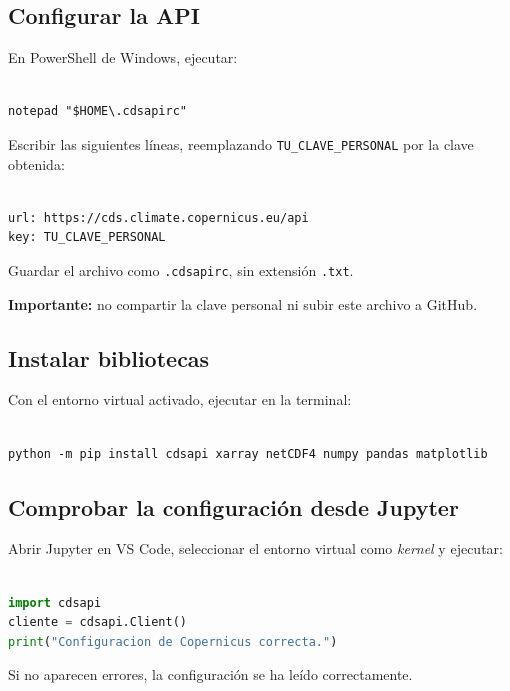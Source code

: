 \documentclass[11pt,a4paper]{article}
\begin{document}
\subsection{Configurar la API}

En PowerShell de Windows, ejecutar:

\begin{lstlisting}[style=codigo]

notepad "$HOME\.cdsapirc"
\end{lstlisting}

Escribir las siguientes líneas, reemplazando
\texttt{TU\_CLAVE\_PERSONAL} por la clave obtenida:

\begin{lstlisting}[style=codigo]

url: https://cds.climate.copernicus.eu/api
key: TU_CLAVE_PERSONAL
\end{lstlisting}

Guardar el archivo como \texttt{.cdsapirc},
sin extensión \texttt{.txt}.

\textbf{Importante:} no compartir la clave personal
ni subir este archivo a GitHub.

\subsection{Instalar bibliotecas}

Con el entorno virtual activado, ejecutar en la terminal:

\begin{lstlisting}[style=codigo]

python -m pip install cdsapi xarray netCDF4 numpy pandas matplotlib
\end{lstlisting}

\subsection{Comprobar la configuración desde Jupyter}

Abrir Jupyter en VS Code, seleccionar el entorno virtual
como \textit{kernel} y ejecutar:

\begin{lstlisting}[style=codigo,language=Python]

import cdsapi
cliente = cdsapi.Client()
print("Configuracion de Copernicus correcta.")
\end{lstlisting}

Si no aparecen errores, la configuración se ha leído correctamente.
\end{document}
